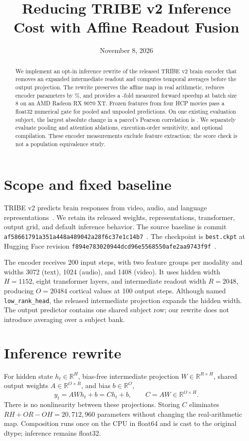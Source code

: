 \documentclass[10pt]{article}
\title{Reducing TRIBE v2 Inference Cost with Affine Readout Fusion}
\author{}
\date{November 8, 2026}
\begin{document}
\maketitle
\begin{abstract}
We implement an opt-in inference rewrite of the released TRIBE v2 brain encoder
that removes an expanded intermediate readout and computes temporal averages
before the output projection. The rewrite preserves the affine map in real
arithmetic, reduces encoder parameters by \ParameterReduction\%, and provides
a \ReadoutSpeedup{}-fold measured forward speedup at batch size 8 on an AMD
Radeon RX 9070 XT. Frozen features from four HCP movies pass a float32
numerical gate for pooled and unpooled predictions. On one existing evaluation
subject, the largest absolute change in a parcel's Pearson correlation is
\MaximumParcelError. We separately evaluate pooling and attention ablations,
execution-order sensitivity, and optional compilation. These encoder measurements
exclude feature extraction; the score check is not a population equivalence study.
\end{abstract}

\section{Scope and fixed baseline}
TRIBE v2 predicts brain responses from video, audio, and language
representations~\cite{paper}. We retain its released weights, representations,
transformer, output grid, and default inference behavior. The source baseline is
commit \texttt{af58661791a351a448a489042a28f6c37e1c14b7}~\cite{code}.
The checkpoint is \texttt{best.ckpt} at Hugging Face revision
\texttt{f894e783020944dcd96e5568550afe2aa9743f9f}~\cite{weights}.

The encoder receives 200 input steps, with two feature groups per modality and
widths 3072 (text), 1024 (audio), and 1408 (video). It uses hidden width $H=1152$,
eight transformer layers, and intermediate readout width $R=2048$, producing
$O=20484$ cortical values at 100 output steps. Although named
\texttt{low\_rank\_head}, the released intermediate projection expands the hidden
width. The output predictor contains one shared subject row; our rewrite does
not introduce averaging over a subject bank.

\section{Inference rewrite}
For hidden state $h_t\in\mathbb{R}^{H}$, bias-free intermediate projection
$W\in\mathbb{R}^{R\times H}$, shared output weights
$A\in\mathbb{R}^{O\times R}$, and bias $b\in\mathbb{R}^{O}$,
\begin{equation}
y_t=AWh_t+b=Ch_t+b,\qquad C=AW\in\mathbb{R}^{O\times H}.
\label{eq:fusion}
\end{equation}
There is no nonlinearity between these projections. Storing $C$ eliminates
$RH+OR-OH=20{,}712{,}960$ parameters without changing the real-arithmetic map.
Composition runs once on the CPU in float64 and is cast to the original dtype;
inference remains float32.
\end{document}
